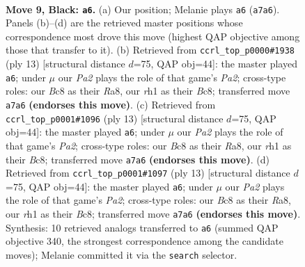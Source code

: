 \documentclass[11pt]{article}
\begin{document}
\clearpage

\begin{figure}[p]\centering
\begin{subfigure}{0.46\textwidth}\centering
\resizebox{\linewidth}{!}{%
\newchessgame
\chessboard[
  setfen={r1b2r1k/ppppqppp/2n1pn2/8/2PP4/2B1PNP1/PP3PBP/R2QK2R b KQ - 2 9},
  showmover=false,
  pgfstyle=straightmove, color=movearrow, markmove={a7-a6}
]}
\caption{}
\end{subfigure}\hfill
\begin{subfigure}{0.46\textwidth}\centering
\resizebox{\linewidth}{!}{%
\newchessgame
\chessboard[
  setfen={r1bqk2r/ppp1p1bp/2np1np1/5p2/1P1P4/2P2NP1/PB2PPBP/RN1QK2R b KQkq - 1 7},
  showmover=false,
  pgfstyle=straightmove, color=movearrow, markmove={a7-a6}
]}
\caption{}
\end{subfigure}
\\[4pt]
\begin{subfigure}{0.46\textwidth}\centering
\resizebox{\linewidth}{!}{%
\newchessgame
\chessboard[
  setfen={r1bqk2r/ppp1p1bp/2np1np1/5p2/1P1P4/2P2NP1/PB2PPBP/RN1QK2R b KQkq - 1 7},
  showmover=false,
  pgfstyle=straightmove, color=movearrow, markmove={a7-a6}
]}
\caption{}
\end{subfigure}\hfill
\begin{subfigure}{0.46\textwidth}\centering
\resizebox{\linewidth}{!}{%
\newchessgame
\chessboard[
  setfen={r1bqk2r/ppp1p1bp/2np1np1/5p2/1P1P4/2P2NP1/PB2PPBP/RN1QK2R b KQkq - 1 7},
  showmover=false,
  pgfstyle=straightmove, color=movearrow, markmove={a7-a6}
]}
\caption{}
\end{subfigure}
\caption{\textbf{Move 9, Black: \texttt{a6}.} (a) Our position; Melanie plays \texttt{a6} (\texttt{a7a6}). Panels (b)--(d) are the retrieved master positions whose correspondence most drove this move (highest QAP objective among those that transfer to it). (b) Retrieved from \texttt{ccrl\_top\_p0000\#1938} (ply 13) [structural distance $d$=75, QAP obj=44]: the master played \texttt{a6}; under $\mu$ our \emph{Pa2} plays the role of that game's \emph{Pa2}; cross-type roles: our \emph{B}c8 as their \emph{R}a8, our \emph{r}h1 as their \emph{B}c8; transferred move \texttt{a7a6} \textbf{(endorses this move)}. (c) Retrieved from \texttt{ccrl\_top\_p0001\#1096} (ply 13) [structural distance $d$=75, QAP obj=44]: the master played \texttt{a6}; under $\mu$ our \emph{Pa2} plays the role of that game's \emph{Pa2}; cross-type roles: our \emph{B}c8 as their \emph{R}a8, our \emph{r}h1 as their \emph{B}c8; transferred move \texttt{a7a6} \textbf{(endorses this move)}. (d) Retrieved from \texttt{ccrl\_top\_p0001\#1097} (ply 13) [structural distance $d$=75, QAP obj=44]: the master played \texttt{a6}; under $\mu$ our \emph{Pa2} plays the role of that game's \emph{Pa2}; cross-type roles: our \emph{B}c8 as their \emph{R}a8, our \emph{r}h1 as their \emph{B}c8; transferred move \texttt{a7a6} \textbf{(endorses this move)}. Synthesis: 10 retrieved analogs transferred to \texttt{a6} (summed QAP objective 340, the strongest correspondence among the candidate moves); Melanie committed it via the \texttt{search} selector.}
\label{fig:thought-m17}
\end{figure}
\end{document}
